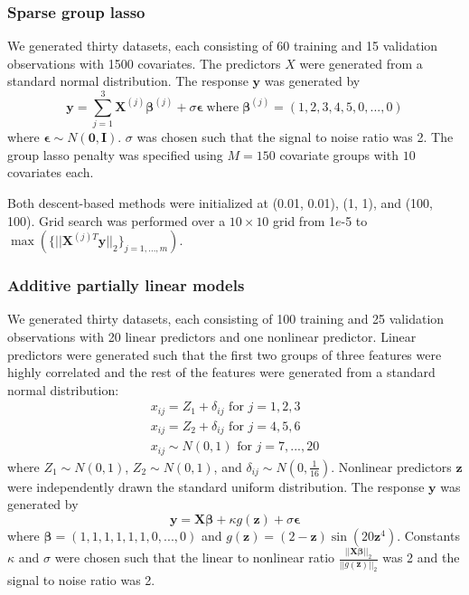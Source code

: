 \documentclass{statsoc}
\begin{document}
\subsubsection{Sparse group lasso}\label{sec:simulation_sgl}
We generated thirty datasets, each consisting of 60 training and 15 validation observations with 1500 covariates. The predictors $X$ were generated from a standard normal distribution. The response $\boldsymbol y$ was generated by
\begin{equation}
\boldsymbol y = \sum\limits_{j=1}^3 \boldsymbol X^{(j)} \boldsymbol \beta^{(j)} + \sigma \boldsymbol \epsilon \; \text{where} \; \boldsymbol \beta^{(j)} = (1, 2, 3, 4, 5, 0, ..., 0)
\end{equation}
where $\boldsymbol \epsilon \sim N(\boldsymbol 0, \boldsymbol I)$. $\sigma$ was chosen such that the signal to noise ratio was 2. The group lasso penalty was specified using $M=150$ covariate groups with $10$ covariates each.

Both descent-based methods were initialized at (0.01, 0.01), (1, 1), and (100, 100). Grid search was performed over a $10 \times 10$ grid from 1$e$-5 to $\max(\{||\boldsymbol X^{(j)T} \boldsymbol y ||_2\}_{j=1,..., m})$.

\subsubsection{Additive partially linear models}\label{sec:simulation_aplm}
We generated thirty datasets, each consisting of 100 training and 25 validation observations with 20 linear predictors and one nonlinear predictor. Linear predictors were generated such that the first two groups of three features were highly correlated and the rest of the features were generated from a standard normal distribution:
\begin{equation}
\begin{array}{c}
x_{ij} = Z_1 + \delta_{ij} \text{ for } j=1, 2, 3 \\
x_{ij} = Z_2 + \delta_{ij} \text{ for } j= 4, 5, 6 \\
x_{ij} \sim N(0,1) \text{ for } j = 7, ..., 20
\end{array}
\end{equation}
where $Z_1 \sim N(0,1)$, $Z_2 \sim N(0,1)$, and $\delta_{ij} \sim N(0, \frac{1}{16})$. Nonlinear predictors $\boldsymbol z$ were independently drawn the standard uniform distribution. The response $\boldsymbol y$ was generated by
\begin{equation}
\boldsymbol y = \boldsymbol X \boldsymbol \beta + \kappa g(\boldsymbol z) + \sigma \boldsymbol \epsilon
\end{equation}
where $\boldsymbol \beta = (1, 1, 1, 1, 1, 1, 0, ..., 0)$ and $g(\boldsymbol z) =(2-\boldsymbol z)\sin(20 \boldsymbol z^4)$. Constants $\kappa$ and $\sigma$ were chosen such that the linear to nonlinear ratio $\frac{||\boldsymbol X \boldsymbol \beta||_2}{||g(\boldsymbol z)||_2}$ was 2 and the signal to noise ratio was 2. 
\end{document}
